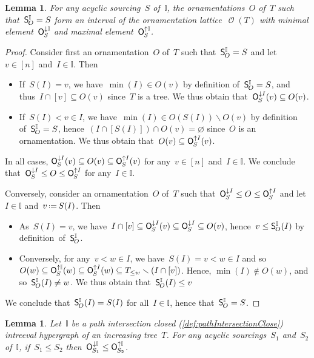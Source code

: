 \documentclass{amsart}
\newtheorem{lemma}[theorem]{Lemma}
\theoremstyle{definition}
\renewcommand{\c}[1]{\mathcal{#1}} %
\newcommand{\ssm}{\smallsetminus} %
\newcommand{\eqdef}{\mbox{\,\raisebox{0.2ex}{\scriptsize\ensuremath{\mathrm:}}\ensuremath{=}\,}} %
\newcommand{\lessin}[2]{#1_{\le#2}} %
\newcommand{\mymap}[2]{\mathsf{#1}_{\hspace{-.7pt}#2}}
\DeclareMathOperator{\Orn}{\c{O}}  %
\newcommand{\minorn}[2]{\mymap{O}{#1}^{\downarrow#2}}  %
\newcommand{\maxorn}[2]{\mymap{O}{#1}^{\uparrow#2}}  %
\newcommand{\sour}[1]{\mymap{S}{#1}}  %
\newcommand{\II}{\mathbb I} %
\begin{document}
\begin{lemma}
\label{lem:Sour2OrnIntreeval2}
For any acyclic sourcing~$S$ of~$\II$, the ornamentations~$O$ of~$T$ such that~$\sour{O}^\II = S$ form an interval of the ornamentation lattice~$\Orn(T)$ with minimal element~$\minorn{S}{\II}$ and maximal element~$\maxorn{S}{\II}$.
\end{lemma}

\begin{proof}
Consider first an ornamentation~$O$ of~$T$ such that~$\sour{O}^\II = S$ and let~$v \in [n]$ and~$I \in \II$. Then
\begin{itemize}
\item If~$S(I) = v$, we have~$\min(I) \in O(v)$ by definition of~$\sour{O}^\II = S$, and thus~$I \cap [v] \subseteq O(v)$ since~$T$ is a tree.
We thus obtain that~$\minorn{S}{I}(v) \subseteq O(v)$.
\item If~$S(I) < v \in I$, we have~$\min(I) \in O(S(I)) \ssm O(v)$ by definition of~$\sour{O}^\II = S$, hence~$(I \cap [S(I)]) \cap O(v) = \varnothing$ since~$O$ is an ornamentation.
We thus obtain that~$O(v) \subseteq \maxorn{S}{I}(v)$.
\end{itemize}
In all cases, $\minorn{S}{I}(v) \subseteq O(v) \subseteq \maxorn{S}{I}(v)$ for any~$v \in [n]$ and~$I \in \II$.
We conclude that~$\minorn{S}{I} \le O \le \maxorn{S}{I}$ for any~$I \in \II$.

Conversely, consider an ornamentation~$O$ of~$T$ such that~$\minorn{S}{I} \le O \le \maxorn{S}{I}$ and let~$I \in \II$ and~$v \eqdef S(I)$. Then
\begin{itemize}
\item As~$S(I) = v$, we have~$I \cap [v] \subseteq \minorn{S}{I}(v) \subseteq \minorn{S}{I} \subseteq O(v)$, hence~$v \le \sour{O}^\II(I)$ by definition~of~$\sour{O}^\II$.
\item Conversely, for any~$v < w \in I$, we have~$S(I) = v < w \in I$ and so~$O(w) \subseteq \maxorn{S}{\II}(w) \subseteq \maxorn{S}{I}(w) \subseteq \lessin{T}{w} \ssm (I \cap [v])$. Hence, $\min(I) \notin O(w)$, and so~$\sour{O}^\II(I) \ne w$. We thus obtain that~$\sour{O}^\II(I) \le v$
\end{itemize}
We conclude that~$\sour{O}^\II(I) = S(I)$ for all~$I \in \II$, hence that~$\sour{O}^\II = S$.
\end{proof}

\begin{lemma}
\label{lem:Sour2OrnIntreeval3}
Let~$\II$ be a path intersection closed (\cref{def:pathIntersectionClose}) intreeval hypergraph of an increasing tree~$T$.
For any acyclic sourcings~$S_1$ and~$S_2$ of~$\II$, if~$S_1 \le S_2$ then~$\minorn{S_1}{\II} \le \maxorn{S_2}{\II}$.
\end{lemma}
\end{document}
